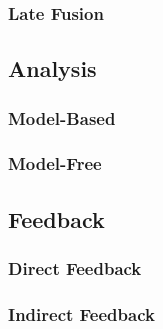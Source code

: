 \documentclass[manuscript,screen,review]{acmart}
\begin{document}

\subsubsection{Late Fusion}


\subsection{Analysis}\label{subsec:findings_analysis}



\subsubsection{Model-Based}

\subsubsection{Model-Free}


\subsection{Feedback}

\subsubsection{Direct Feedback}


\subsubsection{Indirect Feedback}

\end{document}
